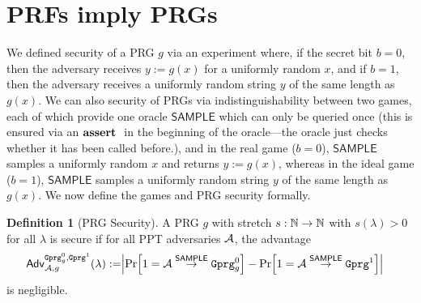 \documentclass[a4paper,table,dvipsnames]{article}
\theoremstyle{definition}
\newtheorem{definition}{Definition}[section]
\newcommand{\M}[1]{\ensuremath{\text{\texttt{#1}}}}
\renewcommand{\O}[1]{\ensuremath{\mathsf{#1}}}
\begin{document}
\section{PRFs imply PRGs}
We defined security of a PRG $g$ via an experiment where, if the secret bit $b=0$,
then the adversary receives $y:=g(x)$ for a uniformly random $x$, and if $b=1$, then
the adversary receives a uniformly random string $y$ of the same length as $g(x)$.
We can also security of PRGs via indistinguishability between two games, each of
which provide one oracle $\O{SAMPLE}$ which can only be queried once (this is ensured
via an $\mathbf{assert}\ $ in the beginning of the oracle---the oracle just checks whether it
has been called before.), and in
the real game ($b=0$), $\O{SAMPLE}$ samples a uniformly random $x$ and returns $y:=g(x)$,
whereas in the ideal game ($b=1$), $\O{SAMPLE}$ samples a uniformly random string $y$
of the same length as $g(x)$. We now define the games and PRG security formally.

\begin{definition}[PRG Security]
A PRG $g$ with stretch $s:\mathbb{N}\rightarrow\mathbb{N}$ with $s(\lambda)>0$ for all $\lambda$ is secure if
for all PPT adversaries $\mathcal{A}$, the advantage
\begin{align*}
\mathsf{Adv}^{\M{Gprg}_g^0,\M{Gprg}^1}_{\adv,g}(\lambda):=&\abs{\prob{1=\adv\stackrel{\O{SAMPLE}}{\rightarrow}\M{Gprg}_g^0}
                                                           -\prob{1=\adv\stackrel{\O{SAMPLE}}{\rightarrow}\M{Gprg}^1}}
\end{align*}
is negligible.
\end{definition}
\end{document}

